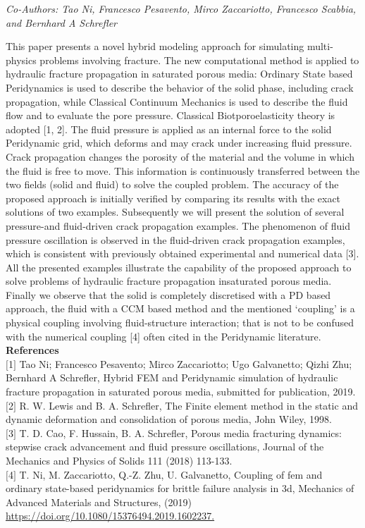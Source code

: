 \begin{center}
\textit{Co-Authors: Tao Ni, Francesco Pesavento, Mirco Zaccariotto, Francesco Scabbia, and Bernhard A Schrefler}
\end{center} 
This paper presents a novel hybrid modeling approach for simulating multi-physics problems involving fracture. The new computational method is applied to hydraulic fracture propagation in saturated porous media: Ordinary State based Peridynamics is used to describe the behavior of the solid phase, including crack propagation, while Classical Continuum Mechanics is used to describe the fluid flow and to evaluate the pore pressure. Classical Biotporoelasticity theory is adopted [1, 2]. The fluid pressure is applied as an internal force to the solid Peridynamic grid, which deforms and may crack under increasing fluid pressure. Crack propagation changes the porosity of the material and the volume in which the fluid is free to move. This information is continuously transferred between the two fields (solid and fluid) to solve the coupled problem.  The accuracy of the proposed approach is initially verified by comparing its results with the exact solutions of two examples.  Subsequently we will present the solution of several pressure-and fluid-driven crack propagation examples. The phenomenon of fluid pressure oscillation is observed in the fluid-driven crack propagation examples, which is consistent with previously obtained experimental and numerical data [3].  All the presented examples illustrate the capability of the proposed approach to solve problems of hydraulic fracture propagation insaturated porous media.  Finally we observe that the solid is completely discretised with a PD based approach, the fluid with a CCM based method and the mentioned ‘coupling’ is a physical coupling involving fluid-structure interaction; that is not to be confused with the numerical coupling [4] often cited in the Peridynamic literature.\\

\noindent\textbf{References}\\
$[$1$]$ Tao Ni; Francesco Pesavento; Mirco Zaccariotto; Ugo Galvanetto; Qizhi Zhu; Bernhard A Schrefler, Hybrid FEM and Peridynamic simulation of hydraulic fracture propagation in saturated porous media, submitted for publication, 2019.\\
$[$2$]$ R. W. Lewis and B. A. Schrefler, The Finite element method in the static and dynamic deformation and consolidation of porous media, John Wiley, 1998.\\
$[$3$]$ T. D. Cao, F. Hussain, B. A. Schrefler, Porous media fracturing dynamics: stepwise crack advancement and fluid pressure oscillations, Journal of the Mechanics and Physics of Solids 111 (2018) 113-133.\\
$[$4$]$ T. Ni, M. Zaccariotto, Q.-Z. Zhu, U. Galvanetto, Coupling of fem and ordinary state-based peridynamics for brittle failure analysis in 3d, Mechanics of Advanced Materials and Structures, (2019) \url{https://doi.org/10.1080/15376494.2019.1602237.}
